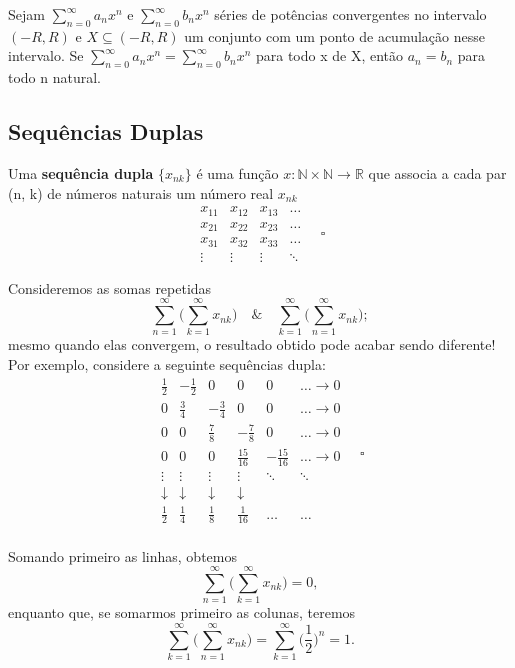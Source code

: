 \documentclass[../analysis_notes.tex]{subfiles}
\begin{document}
\begin{crl*}
	Sejam \(\sum\limits_{n=0}^{\infty}a_{n}x^{n}\) e \(\sum\limits_{n=0}^{\infty}b_{n}x^{n}\) séries de potências convergentes no intervalo \((-R, R)\) e \(X\subseteq (-R, R)\) um conjunto com um ponto de acumulação nesse intervalo. Se \(\sum\limits_{n=0}^{\infty}a_{n}x^{n}=\sum\limits_{n=0}^{\infty}b_{n}x^{n}\) para todo x de X, então \(a_{n}=b_{n}\) para todo n natural.
\end{crl*}
\subsection{Sequências Duplas}
\begin{def*}
	Uma \textbf{sequência dupla} \(\{x_{nk}\}\) é uma função \(x:\mathbb{N}\times \mathbb{N}\rightarrow \mathbb{R}\) que associa a cada par (n, k) de números naturais um número real \(x_{nk}\)
	\[\begin{matrix}
			x_{11} & x_{12} & x_{13} & \dotsc \\
			x_{21} & x_{22} & x_{23} & \dotsc \\
			x_{31} & x_{32} & x_{33} & \dotsc \\
			\vdots & \vdots & \vdots & \ddots
		\end{matrix}\quad \square\]
\end{def*}
\begin{example}
	Consideremos as somas repetidas
	\[
		\sum\limits_{n=1}^{\infty}\biggl(\sum\limits_{k=1}^{\infty}x_{nk}\biggr) \quad\&\quad \sum\limits_{k=1}^{\infty}\biggl(\sum\limits_{n=1}^{\infty}x_{nk}\biggr);
	\]
	mesmo quando elas convergem, o resultado obtido pode acabar sendo diferente! Por exemplo, considere a seguinte sequências dupla:
	\[\begin{matrix}
			\frac{1}{2} & -\frac{1}{2} & 0            & 0             & 0              & \dotsc \rightarrow 0 \\
			0           & \frac{3}{4}  & -\frac{3}{4} & 0             & 0              & \dotsc \rightarrow 0 \\
			0           & 0            & \frac{7}{8}  & -\frac{7}{8}  & 0              & \dotsc \rightarrow 0 \\
			0           & 0            & 0            & \frac{15}{16} & -\frac{15}{16} & \dotsc \rightarrow 0 \\
			\vdots      & \vdots       & \vdots       & \vdots        & \ddots         & \ddots               \\
			\downarrow  & \downarrow   & \downarrow   & \downarrow    &                &                      \\
			\frac{1}{2} & \frac{1}{4}  & \frac{1}{8}  & \frac{1}{16}  & \dotsc         & \dotsc               \\
		\end{matrix}\quad \square\]

	Somando primeiro as linhas, obtemos
	\[
		\sum\limits_{n=1}^{\infty}\biggl(\sum\limits_{k=1}^{\infty}x_{nk}\biggr)=0,
	\]
	enquanto que, se somarmos primeiro as colunas, teremos
	\[
		\sum\limits_{k=1}^{\infty}\biggl(\sum\limits_{n=1}^{\infty}x_{nk}\biggr) = \sum\limits_{k=1}^{\infty}\biggl(\frac{1}{2}\biggr)^{n}=1.
	\]
\end{example}
\end{document}
